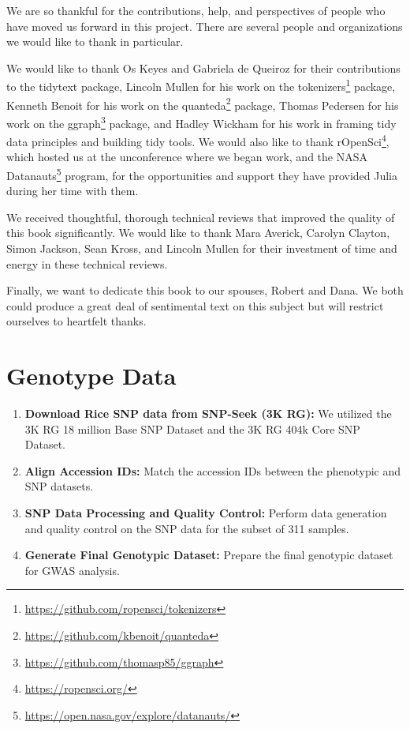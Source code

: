 \documentclass[
]{book}
\DeclareRobustCommand{\href}[2]{#2\footnote{\url{#1}}}
\begin{document}
We are so thankful for the contributions, help, and perspectives of people who have moved us forward in this project. There are several people and organizations we would like to thank in particular.

We would like to thank Os Keyes and Gabriela de Queiroz for their contributions to the tidytext package, Lincoln Mullen for his work on the \href{https://github.com/ropensci/tokenizers}{tokenizers} package, Kenneth Benoit for his work on the \href{https://github.com/kbenoit/quanteda}{quanteda} package, Thomas Pedersen for his work on the \href{https://github.com/thomasp85/ggraph}{ggraph} package, and Hadley Wickham for his work in framing tidy data principles and building tidy tools. We would also like to thank \href{https://ropensci.org/}{rOpenSci}, which hosted us at the unconference where we began work, and the \href{https://open.nasa.gov/explore/datanauts/}{NASA Datanauts} program, for the opportunities and support they have provided Julia during her time with them.

We received thoughtful, thorough technical reviews that improved the quality of this book significantly. We would like to thank Mara Averick, Carolyn Clayton, Simon Jackson, Sean Kross, and Lincoln Mullen for their investment of time and energy in these technical reviews.

Finally, we want to dedicate this book to our spouses, Robert and Dana. We both could produce a great deal of sentimental text on this subject but will restrict ourselves to heartfelt thanks.

\chapter{Genotype Data}\label{tidytext}

\begin{enumerate}
\def\labelenumi{\arabic{enumi}.}
\item
  \textbf{Download Rice SNP data from SNP-Seek (3K RG):} We utilized the 3K RG 18 million Base SNP Dataset and the 3K RG 404k Core SNP Dataset.
\item
  \textbf{Align Accession IDs:} Match the accession IDs between the phenotypic and SNP datasets.
\item
  \textbf{SNP Data Processing and Quality Control:} Perform data generation and quality control on the SNP data for the subset of 311 samples.
\item
  \textbf{Generate Final Genotypic Dataset:} Prepare the final genotypic dataset for GWAS analysis.
\end{enumerate}
\end{document}
